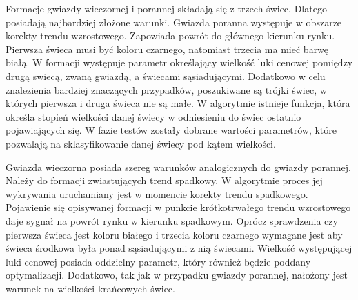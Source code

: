 \documentclass[pdflatex,11pt]{aghdpl}
\begin{document}
Formacje gwiazdy wieczornej i porannej składają się z trzech świec. Dlatego posiadają najbardziej złożone warunki. Gwiazda poranna występuje w obszarze korekty trendu wzrostowego. Zapowiada powrót do głównego kierunku rynku. Pierwsza świeca musi być koloru czarnego, natomiast trzecia ma mieć barwę białą. W formacji występuje parametr określający wielkość luki cenowej pomiędzy drugą swiecą, zwaną gwiazdą, a świecami sąsiadującymi. Dodatkowo w celu znalezienia bardziej znaczących przypadków, poszukiwane są trójki świec, w których pierwsza i druga świeca nie są małe. W algorytmie istnieje funkcja, która określa stopień wielkości danej świecy w odniesieniu do świec ostatnio pojawiających się. W fazie testów zostały dobrane wartości parametrów, które pozwalają na sklasyfikowanie danej świecy pod kątem wielkości.

Gwiazda wieczorna posiada szereg warunków analogicznych do gwiazdy porannej. Należy do formacji zwiastujących trend spadkowy. W algorytmie proces jej wykrywania uruchamiany jest w momencie korekty trendu spadkowego. Pojawienie się opisywanej formacji w punkcie krótkotrwałego trendu wzrostowego daje sygnał na powrót rynku w kierunku spadkowym. Oprócz sprawdzenia czy pierwsza świeca jest koloru białego i trzecia koloru czarnego wymagane jest aby świeca środkowa była ponad sąsiadującymi z nią świecami. Wielkość występującej luki cenowej posiada oddzielny parametr, który również będzie poddany optymalizacji. Dodatkowo, tak jak w przypadku gwiazdy porannej, nałożony jest warunek na wielkości krańcowych świec. 
\end{document}
